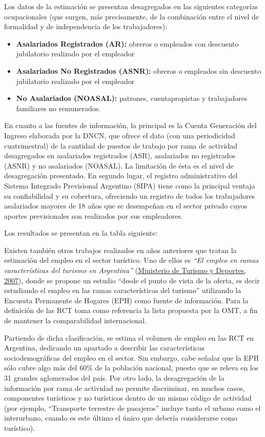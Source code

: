 \documentclass[
  openany]{book}
\providecommand{\tightlist}{%
  \setlength{\itemsep}{0pt}\setlength{\parskip}{0pt}}
\begin{document}
Los datos de la estimación se presentan desagregados en las siguientes categorías ocupacionales (que surgen, más precisamente, de la combinación entre el nivel de formalidad y de independencia de los trabajadores):

\begin{itemize}
\tightlist
\item
  \textbf{Asalariados Registrados (AR):} obreros o empleados con descuento jubilatorio realizado por el empleador
\item
  \textbf{Asalariados No Registrados (ASNR):} obreros o empleados sin descuento jubilatorio realizado por el empleador
\item
  \textbf{No Asalariados (NOASAL):} patrones, cuentapropistas y trabajadores familiares no remunerados.
\end{itemize}

En cuanto a las fuentes de información, la principal es la Cuenta Generación del Ingreso elaborada por la DNCN, que ofrece el dato (con una periodicidad cuatrimestral) de la cantidad de puestos de trabajo por rama de actividad desagregados en asalariados registrados (ASR), asalariados no registrados (ASNR) y no asalariados (NOASAL). La limitación de ésta es el nivel de desagregación presentado. En segundo lugar, el registro administrativo del Sistema Integrado Previsional Argentino (SIPA) tiene como la principal ventaja su confiabilidad y su cobertura, ofreciendo un registro de todos los trabajadores asalariados mayores de 18 años que se desempeñan en el sector privado cuyos aportes previsionales son realizados por sus empleadores.

Los resultados se presentan en la tabla siguiente:

Existen también otros trabajos realizados en años anteriores que tratan la estimación del empleo en el sector turístico. Uno de ellos es \emph{``El empleo en ramas características del turismo en Argentina''} (\protect\hyperlink{ref-mintur2007}{Ministerio de Turismo y Deportes, 2007}), donde se propone un estudio ``desde el punto de vista de la oferta, es decir estudiando el empleo en las ramas características del turismo'' utilizando la Encuesta Permanente de Hogares (EPH) como fuente de información. Para la definición de las RCT toma como referencia la lista propuesta por la OMT, a fin de mantener la comparabilidad internacional.

Partiendo de dicha clasificación, se estima el volumen de empleo en las RCT en Argentina, dedicando un apartado a describir las características sociodemográficas del empleo en el sector. Sin embargo, cabe señalar que la EPH sólo cubre algo más del 60\% de la población nacional, puesto que se releva en los 31 grandes aglomerados del país. Por otro lado, la desagregación de la información por rama de actividad no permite discriminar, en muchos casos, componentes turísticos y no turísticos dentro de un mismo código de actividad (por ejemplo, ``Transporte terrestre de pasajeros'' incluye tanto el urbano como el interurbano, cuando es este último el único que debería considerarse como turístico).
\end{document}
